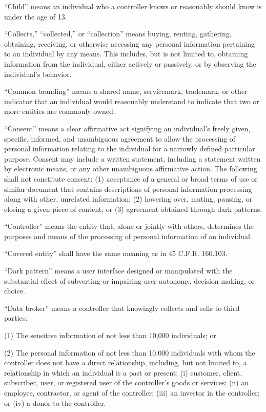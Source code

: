 “Child” means an individual who a controller knows or reasonably should know is under the age of 13. 

“Collects,” “collected,” or “collection” means buying, renting, gathering, obtaining, receiving, or otherwise accessing any personal information pertaining to an individual by any means. This includes, but is not limited to, obtaining information from the individual, either actively or passively, or by observing the individual’s behavior.

“Common branding” means a shared name, servicemark, trademark, or other indicator that an individual would reasonably understand to indicate that two or more entities are commonly owned.

“Consent” means a clear affirmative act signifying an individual’s freely given, specific, informed, and unambiguous agreement to allow the processing of personal information relating to the individual for a narrowly defined particular purpose. Consent may include a written statement, including a statement written by electronic means, or any other unambiguous affirmative action. The following shall not constitute consent: (1) acceptance of a general or broad terms of use or similar document that contains descriptions of personal information processing along with other, unrelated information; (2) hovering over, muting, pausing, or closing a given piece of content; or (3) agreement obtained through dark patterns.

“Controller” means the entity that, alone or jointly with others, determines the purposes and means of the processing of personal information of an individual.

“Covered entity” shall have the same meaning as in 45 C.F.R. 160.103.

“Dark pattern” means a user interface designed or manipulated with the substantial effect of subverting or impairing user autonomy, decision-making, or choice.

“Data broker” means a controller that knowingly collects and sells to third parties:

(1) The sensitive information of not less than 10,000 individuals; or

(2) The personal information of not less than 10,000 individuals with whom the controller does not have a direct relationship, including, but not limited to, a relationship in which an individual is a past or present: (i) customer, client, subscriber, user, or registered user of the controller’s goods or services; (ii) an employee, contractor, or agent of the controller; (iii) an investor in the controller; or (iv) a donor to the controller.

